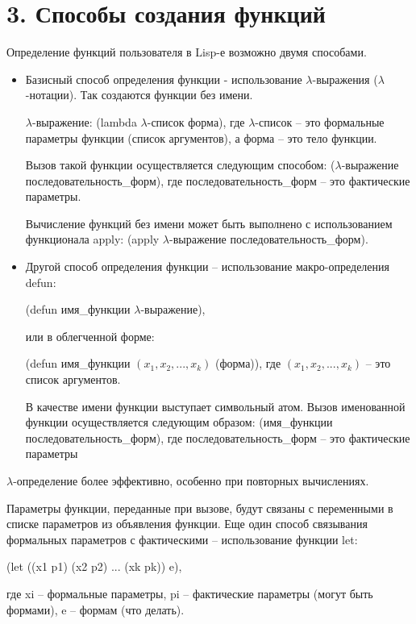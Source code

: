 \documentclass[12pt]{report}
\begin{document}
\section*{3. Способы создания функций}

Определение функций пользователя в Lisp-е возможно двумя способами.


\begin{itemize}
	\item Базисный способ  определения  функции - использование $\lambda$-выражения ($\lambda$-нотации). Так создаются функции без имени.
	
	$\lambda$-выражение: (lambda $\lambda$-список форма), 
	где $\lambda$-список --  это формальные параметры функции (список аргументов), а форма -- это тело функции.
	
	Вызов такой функции осуществляется следующим способом: ($\lambda$-выражение последовательность\_форм), 
	где последовательность\_форм -- это фактические параметры.
	
	Вычисление функций без имени может быть выполнено с использованием функционала apply: (apply $\lambda$-выражение последовательность\_форм).
	
	\item Другой способ определения функции -- использование макро-определения defun: 
	
	(defun имя\_функции $\lambda$-выражение), 
	
	или  в облегченной форме:
	
	(defun имя\_функции $(x_1, x_2, ..., x_k)$ (форма)), 
	где $(x_1, x_2, ..., x_k)$ -- это  список аргументов.
	
	В качестве имени функции выступает символьный атом. 
	Вызов именованной функции осуществляется следующим образом: (имя\_функции последовательность\_форм), 
	где последовательность\_форм -- это фактические параметры
	
\end{itemize}

$\lambda$-определение более эффективно, особенно при повторных вычислениях. 

Параметры функции, переданные при вызове, будут связаны с переменными в списке параметров из объявления функции. Еще один способ связывания формальных параметров с фактическими -- использование функции let:

(let ((x1 p1) (x2 p2) ... (xk pk))  e),

где xi -- формальные параметры, pi -- фактические параметры (могут быть формами), e -- формам (что делать).
\end{document}
